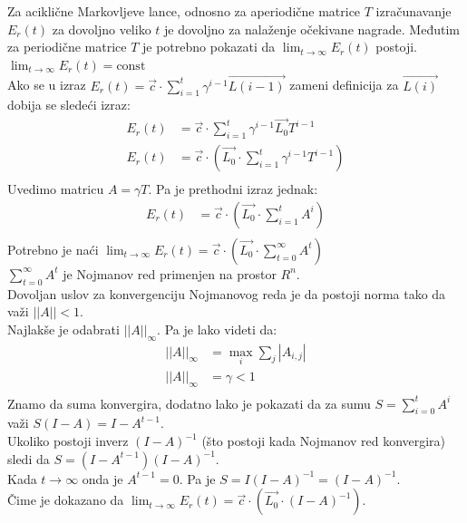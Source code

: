 \documentclass[a4paper,fleqn,12pt]{JMThesis}
\theoremstyle{plain}
\theoremstyle{definition}
\newcommand{\zbtg}{\sum_{t=0}^\infty}
\theoremstyle{definition}
\begin{document}
\medskip
Za aciklične Markovljeve lance, odnosno za aperiodične matrice $T$ izračunavanje $E_r(t)$ za dovoljno veliko $t$ je dovoljno za nalaženje očekivane nagrade.
Međutim za periodične matrice $T$ je potrebno pokazati da $\lim_{t \to \infty}{E_r(t)}$ postoji.
\lem $\lim_{t \to \infty}{E_r(t)} = \text{const}$\\
Ako se u izraz $E_r(t) = \vec{c} \cdot \sum_{i=1}^{t}\gamma^{i-1}\vec{L(i-1)}$ zameni definicija za $\vec{L(i)}$ dobija se sledeći izraz:
\[
	\begin{split}
	E_r(t) &= \vec{c} \cdot \sum_{i=1}^{t}\gamma^{i-1}\vec{L_0}T^{i-1}\\
	E_r(t) &= \vec{c} \cdot \left( \vec{L_0} \cdot \sum_{i=1}^{t}\gamma^{i-1}T^{i-1}\right)\\
	\end{split}
\]
Uvedimo matricu $A = \gamma T$. Pa je prethodni izraz jednak: \\
\[
	\begin{split}
	E_r(t) &= \vec{c} \cdot \left( \vec{L_0} \cdot \sum_{i=1}^{t}A^i \right)\\
	\end{split}
\]
Potrebno je naći $\lim_{t \to \infty}{E_r(t)} = \vec{c} \cdot \left( \vec{L_0}\cdot \zbtg A^t \right)$\\
$\zbtg A^t$ je Nojmanov red primenjen na prostor $R^n$.\\
Dovoljan uslov za konvergenciju Nojmanovog reda je da postoji norma tako da važi $||A|| < 1$.\\
Najlakše je odabrati $||A||_{\infty}$. Pa je lako videti da:
\[
	\begin{split}
	||A||_{\infty} &= \max_{i}\sum_{j}|A_{i,j}|\\
	||A||_{\infty} &= \gamma < 1\\
	\end{split}
\]
Znamo da suma konvergira, dodatno lako je pokazati da za sumu $S = \sum_{i=0}^{t}A^i$ važi $S(I - A) = I - A^{t-1}$.\\
Ukoliko postoji inverz $(I - A)^{-1}$ (što postoji kada Nojmanov red konvergira) sledi da $S=(I - A^{t-1})(I-A)^{-1}$.\\
Kada $t \to \infty$ onda je $A^{t-1} = 0$. Pa je $S = I(I-A)^{-1} = (I-A)^{-1}$.\\
Čime je dokazano da $\lim_{t \to \infty}{E_r(t)} = \vec{c} \cdot \left( \vec{L_0} \cdot (I-A)^{-1} \right)$.
\medskip \\
\end{document}
